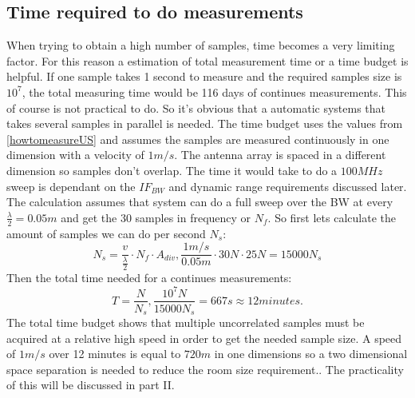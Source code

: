 \subsection{Time required to do measurements}
When trying to obtain a high number of samples, time becomes a very limiting factor. For this reason a estimation of total measurement time or a time budget is helpful. If one sample takes 1 second to measure and the required samples size is $10^7$, the total measuring time would be 116 days of continues measurements. This of course is not practical to do. So it's obvious that a automatic systems that takes several samples in parallel is needed. The time budget uses the values from  \autoref{howtomeasureUS} and assumes the samples are measured continuously in one dimension with a velocity of $1m/s$. 
The antenna array is spaced in a different dimension so samples don't overlap. The time it would take to do a $100MHz$ sweep is dependant on the $IF_{BW}$ and dynamic range requirements discussed later. The calculation assumes that system can do a full sweep over the BW at every $\frac{\lambda}{2} = 0.05m$ and get the 30 samples in frequency or $N_f$. So first lets calculate the amount of samples we can do per second $N_s$:
\begin{equation}
N_s = \frac{v}{\frac{\lambda}{2}}\cdot N_f \cdot A_{div}, \frac{1m/s}{0.05m} \cdot 30N \cdot 25N = 15000N_s
\end{equation}
Then the total time needed for a continues measurements:
\begin{equation}
T = \frac{N}{N_s} , \frac{10^7N}{15000N_s} = 667s \approx 12 minutes.
\end{equation}
The total time budget shows that multiple uncorrelated samples must be acquired at a relative high speed in order to get the needed sample size. A speed of $1m/s$ over 12 minutes is equal to $720m$ in one dimensions so a two dimensional space separation is needed to reduce the room size requirement.. The practicality of this will be discussed in part II.

